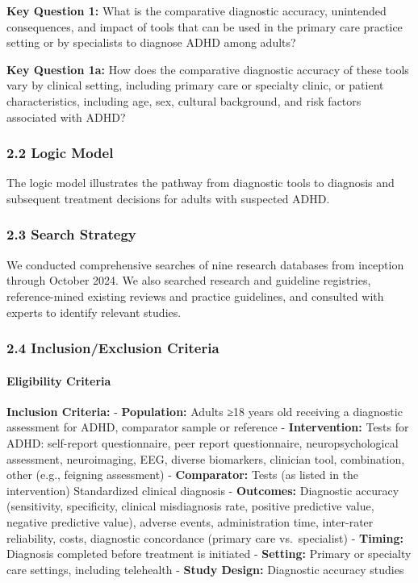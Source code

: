 \documentclass[
  12pt,
  letterpaper,
]{article}
\renewcommand{\[}{\begin{singlespace}\oldDisplayMath}
\renewcommand{\]}{\endoldDisplayMath\end{singlespace}\vspace{\baselineskip}}
\begin{document}
\textbf{Key Question 1:} What is the comparative diagnostic accuracy,
unintended consequences, and impact of tools that can be used in the
primary care practice setting or by specialists to diagnose ADHD among
adults?

\textbf{Key Question 1a:} How does the comparative diagnostic accuracy
of these tools vary by clinical setting, including primary care or
specialty clinic, or patient characteristics, including age, sex,
cultural background, and risk factors associated with ADHD?

\subsubsection{2.2 Logic Model}\label{logic-model}

The logic model illustrates the pathway from diagnostic tools to
diagnosis and subsequent treatment decisions for adults with suspected
ADHD.

\subsubsection{2.3 Search Strategy}\label{search-strategy}

We conducted comprehensive searches of nine research databases from
inception through October 2024. We also searched research and guideline
registries, reference-mined existing reviews and practice guidelines,
and consulted with experts to identify relevant studies.

\subsubsection{2.4 Inclusion/Exclusion
Criteria}\label{inclusionexclusion-criteria}

\paragraph{Eligibility Criteria}\label{eligibility-criteria}

\textbf{Inclusion Criteria:} - \textbf{Population:} Adults ≥18 years old
receiving a diagnostic assessment for ADHD, comparator sample or
reference - \textbf{Intervention:} Tests for ADHD: self-report
questionnaire, peer report questionnaire, neuropsychological assessment,
neuroimaging, EEG, diverse biomarkers, clinician tool, combination,
other (e.g., feigning assessment) - \textbf{Comparator:} Tests (as
listed in the intervention) Standardized clinical diagnosis -
\textbf{Outcomes:} Diagnostic accuracy (sensitivity, specificity,
clinical misdiagnosis rate, positive predictive value, negative
predictive value), adverse events, administration time, inter-rater
reliability, costs, diagnostic concordance (primary care vs.~specialist)
- \textbf{Timing:} Diagnosis completed before treatment is initiated -
\textbf{Setting:} Primary or specialty care settings, including
telehealth - \textbf{Study Design:} Diagnostic accuracy studies
\end{document}
